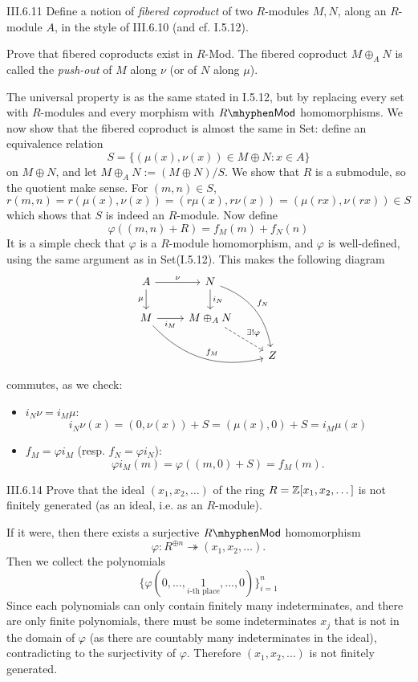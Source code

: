 \begin{problem}{III.6.11}
Define a notion of \emph{fibered coproduct} of two $R$-modules $M, N$, along an $R$-module $A$, in the style of III.6.10 (and cf. I.5.12).

Prove that fibered coproducts exist in $R$-\textsf{Mod}. The fibered coproduct $M \oplus_A N$ is called the \emph{push-out} of $M$ along $\nu$ (or of $N$ along $\mu$).
\end{problem}
\begin{pf}
The universal property is as the same stated in I.5.12, but by replacing every set with $R$-modules and every morphism with $R\mhyphen\mathsf{Mod}$ homomorphisms. We now show that the fibered coproduct is almost the same in \textsf{Set}: define an equivalence relation
\[
S = \{(\mu(x), \nu(x)) \in M \oplus N : x \in A\}
\]
on $M \oplus N$, and let $M \oplus_A N := (M \oplus N)/S$. We show that $R$ is a submodule, so the quotient make sense. For $(m,n) \in S$,
\[
r(m,n) = r(\mu(x),\nu(x)) = (r\mu(x), r\nu(x)) = (\mu(rx), \nu(rx)) \in S	
\]
which shows that $S$ is indeed an $R$-module. Now define
\[
\varphi((m,n)+R) = f_M(m) + f_N(n)	
\]
It is a simple check that $\varphi$ is a $R$-module homomorphism, and $\varphi$ is well-defined, using the same argument as in \textsf{Set}(I.5.12). This makes the following diagram 
\[
\begin{tikzcd}
A \arrow[r, "\nu"] \arrow[d, "\mu"']       & N \arrow[d, "i_N"] \arrow[rdd, "f_N", bend left]          &   \\
M \arrow[r, "i_M"'] \arrow[rrd, "f_M", bend right] & M \oplus_A N \arrow[rd, "\exists!\varphi", dashed] &   \\
&                                                    & Z
\end{tikzcd}	
\]
commutes, as we check:
\begin{itemize}
\item $i_N \nu = i_M \mu$:
\[
i_N \nu (x) = (0, \nu(x)) + S = (\mu(x), 0) + S = i_M \mu(x)
\]
\item $f_M = \varphi i_M $ (resp. $f_N = \varphi i_N$):
\[
\varphi	i_M (m) = \varphi((m,0)+S) = f_M(m).
\]
\end{itemize}
\end{pf}



\begin{problem}{III.6.14}
Prove that the ideal $(x_1,x_2,\dotsc)$ of the ring $R = \mathbb{Z}[x_1,x_2,\dotsc]$ is not finitely generated (as an ideal, i.e. as an $R$-module).
\end{problem}
\begin{pf}
If it were, then there exists a surjective $R\mhyphen\mathsf{Mod}$ homomorphism
\[
\varphi : R^{\oplus n} \twoheadrightarrow (x_1,x_2,\dotsc).
\]
Then we collect the polynomials 
\[
\{\varphi(0,\dotsc,\underset{i\text{-th place}}{1},\dotsc,0)\}_{i = 1}^n	
\]
Since each polynomials can only contain finitely many indeterminates, and there are only finite polynomials, there must be some indeterminates $x_j$ that is not in the domain of $\varphi$ (as there are countably many indeterminates in the ideal), contradicting to the surjectivity of $\varphi$. Therefore $(x_1,x_2,\dotsc)$ is not finitely generated.
\end{pf}

